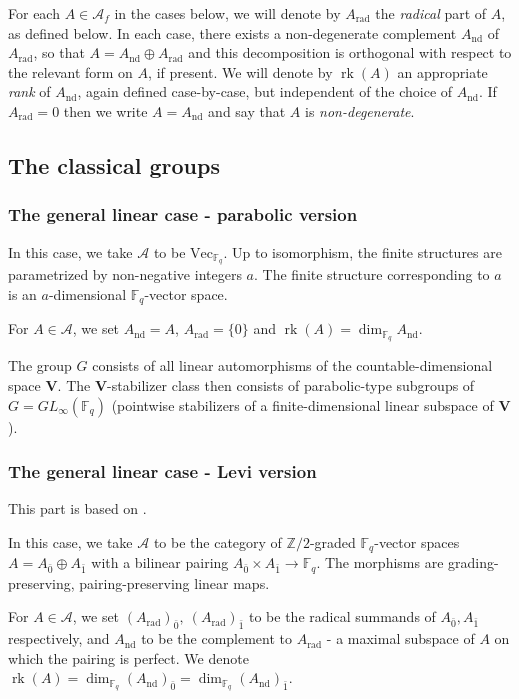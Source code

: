 \documentclass[11pt,a4paper]{amsart}
\theoremstyle{plain}%
\theoremstyle{definition}
\theoremstyle{remark}
\newcommand{\rk}{{\operatorname{rk}}}
\newcommand{\Z}{{\mathbb Z}}
\newcommand{\V}{\mathbf{V}}
\newcommand{\F}{{\mathbb F}}
\newcommand{\rad}{\operatorname{rad}}
\newcommand{\nd}{\mathrm{nd}}
\begin{document}
For each $A\in \mathcal{A}_f$ in the cases below, we will denote by $A_\mathrm{rad}$ the \emph{radical} part of $A$, as defined below. In each case, there exists a non-degenerate complement $A_{\mathrm{nd}}$ of $A_\mathrm{rad}${,} so that $A=A_\mathrm{nd}\oplus A_\mathrm{rad}$ and this decomposition is orthogonal with respect to the relevant form on $A$, if present. We will denote by $\rk(A)$ an appropriate \emph{rank} of $A_{\mathrm{nd}}$, again defined case-by-case, but independent of the choice of $ A_{\mathrm{nd}}$. If $A_{\rad}=0$ then we write $A=A_{\nd}$ and say that $A$ is \emph{non-degenerate}.


\subsection{The classical groups}\label{sec:classical-cases}

\subsubsection{The general linear case - parabolic version}

In this case, we take $\mathcal{A}$ to be $\mathrm{Vec}_{\F_q}$. Up to isomorphism, the finite structures are parametrized by non-negative integers $a$. The finite structure corresponding to $a$ is an $a$-dimensional $\F_q$-vector space. 

For $A\in \mathcal{A}$, we set $A_{\mathrm{nd}}=A$, $A_{\mathrm{rad}}=\{0\}$ and $\rk(A)=\dim_{\F_q} A_{\mathrm{nd}}$.

The group $G$ consists of {all linear} automorphisms of the countable-dimensional space $\V$. The $\V$-stabilizer class then consists of parabolic-type subgroups of $G=GL_{\infty}(\F_q)$ (pointwise stabilizers of a finite-dimensional linear subspace of $\V$). 



\subsubsection{The general linear case - Levi version}
This part is based on \cite[\S6.1]{HS-classical}.

In this case, we take $\mathcal{A}$ to be the category of $\Z/2$-graded $\F_q$-vector spaces $A=A_{\bar 0}\oplus A_{\bar 1}$
with a bilinear pairing $A_{\bar 0}\times A_{\bar 1}\to\F_q$. The morphisms are grading-preserving, pairing-preserving linear maps.

For $A\in \mathcal{A}$, we set $(A_{\mathrm{rad}})_{\bar 0},~ (A_{\mathrm{rad}})_{\bar 1}$ to be the radical summands of $A_{\bar 0}, A_{\bar 1}$ respectively, and $A_{\mathrm{nd}}$ to be the complement to $A_{\mathrm{rad}}$ - a maximal subspace of $A$ on which the pairing is perfect. We denote $\rk(A)=\dim_{\F_q}(A_{\mathrm{nd}})_{\bar 0}={\dim_{\F_q}}(A_{\mathrm{nd}})_{\bar 1}$.
\end{document}

